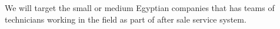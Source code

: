 We will target the small or medium Egyptian companies that has teams of technicians working in the field as part of after sale service system.